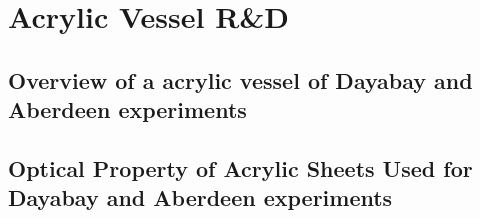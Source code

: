 \chapter {Acrylic Vessel R\&D}

\section {Overview of a acrylic vessel of Dayabay and Aberdeen experiments}

\section {Optical Property of Acrylic Sheets Used for Dayabay and Aberdeen experiments}
